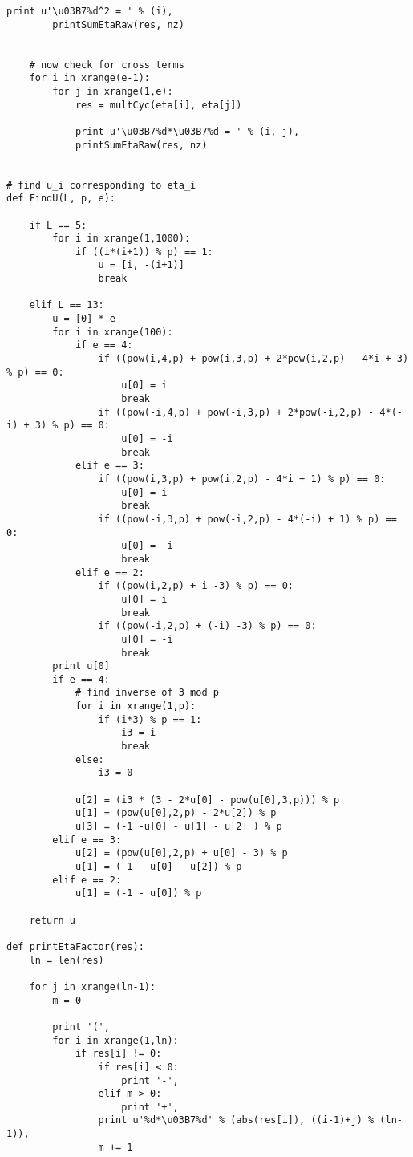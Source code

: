 \documentclass[aps,preprint,preprintnumbers,nofootinbib,showpacs,prd]{revtex4-1}
\begin{document}
\begin{Verbatim}[baselinestretch=0.75]
        print u'\u03B7%d^2 = ' % (i),
        printSumEtaRaw(res, nz)
        

    # now check for cross terms
    for i in xrange(e-1):
        for j in xrange(1,e):
            res = multCyc(eta[i], eta[j])

            print u'\u03B7%d*\u03B7%d = ' % (i, j),
            printSumEtaRaw(res, nz)
            

# find u_i corresponding to eta_i
def FindU(L, p, e):

    if L == 5:
        for i in xrange(1,1000):
            if ((i*(i+1)) % p) == 1:
                u = [i, -(i+1)]
                break
    
    elif L == 13:
        u = [0] * e
        for i in xrange(100):
            if e == 4:
                if ((pow(i,4,p) + pow(i,3,p) + 2*pow(i,2,p) - 4*i + 3) % p) == 0:
                    u[0] = i
                    break
                if ((pow(-i,4,p) + pow(-i,3,p) + 2*pow(-i,2,p) - 4*(-i) + 3) % p) == 0:
                    u[0] = -i
                    break
            elif e == 3:
                if ((pow(i,3,p) + pow(i,2,p) - 4*i + 1) % p) == 0:
                    u[0] = i
                    break
                if ((pow(-i,3,p) + pow(-i,2,p) - 4*(-i) + 1) % p) == 0:
                    u[0] = -i
                    break
            elif e == 2:
                if ((pow(i,2,p) + i -3) % p) == 0:
                    u[0] = i
                    break
                if ((pow(-i,2,p) + (-i) -3) % p) == 0:
                    u[0] = -i
                    break
        print u[0]
        if e == 4:
            # find inverse of 3 mod p
            for i in xrange(1,p):
                if (i*3) % p == 1:
                    i3 = i
                    break
            else:
                i3 = 0
                
            u[2] = (i3 * (3 - 2*u[0] - pow(u[0],3,p))) % p
            u[1] = (pow(u[0],2,p) - 2*u[2]) % p
            u[3] = (-1 -u[0] - u[1] - u[2] ) % p
        elif e == 3:
            u[2] = (pow(u[0],2,p) + u[0] - 3) % p
            u[1] = (-1 - u[0] - u[2]) % p
        elif e == 2:
            u[1] = (-1 - u[0]) % p

    return u

def printEtaFactor(res):
    ln = len(res)

    for j in xrange(ln-1):
        m = 0

        print '(',
        for i in xrange(1,ln):
            if res[i] != 0:
                if res[i] < 0:
                    print '-',
                elif m > 0:
                    print '+',
                print u'%d*\u03B7%d' % (abs(res[i]), ((i-1)+j) % (ln-1)),
                m += 1
            

\end{Verbatim}
\end{document}
